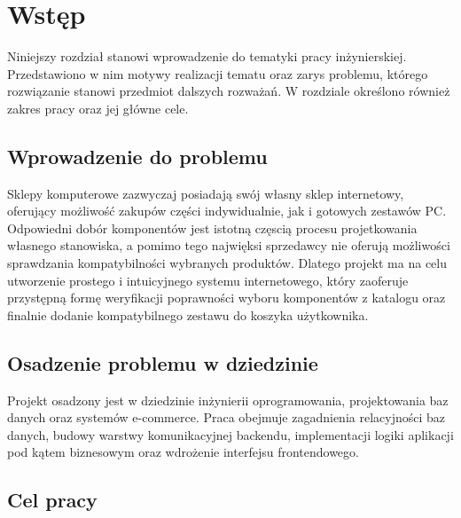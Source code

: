 \documentclass[a4paper,twoside,12pt]{book}
\begin{document}
\chapter{Wstęp}
\label{ch:wstep}
Niniejszy rozdział stanowi wprowadzenie do tematyki pracy inżynierskiej.
Przedstawiono w nim motywy realizacji tematu oraz zarys problemu, którego 
rozwiązanie stanowi przedmiot dalszych rozważań. W rozdziale określono również 
zakres pracy oraz jej główne cele.

\section{Wprowadzenie do problemu}
Sklepy komputerowe zazwyczaj posiadają swój własny sklep internetowy, oferujący możliwość zakupów części indywidualnie, jak i gotowych zestawów PC. Odpowiedni dobór komponentów jest istotną częscią procesu projetkowania własnego stanowiska, a pomimo tego najwięksi sprzedawcy nie oferują możliwości sprawdzania kompatybilności wybranych produktów. Dlatego projekt ma na celu utworzenie prostego i intuicyjnego systemu internetowego, który zaoferuje przystępną formę weryfikacji poprawności wyboru komponentów z katalogu oraz finalnie dodanie kompatybilnego zestawu do koszyka użytkownika. 

\section{Osadzenie problemu w dziedzinie}
Projekt osadzony jest w dziedzinie inżynierii oprogramowania, projektowania baz danych oraz systemów e-commerce. Praca obejmuje zagadnienia relacyjności baz danych, budowy warstwy komunikacyjnej backendu, implementacji logiki aplikacji pod kątem biznesowym oraz wdrożenie interfejsu frontendowego.

\section{Cel pracy}
\end{document}

